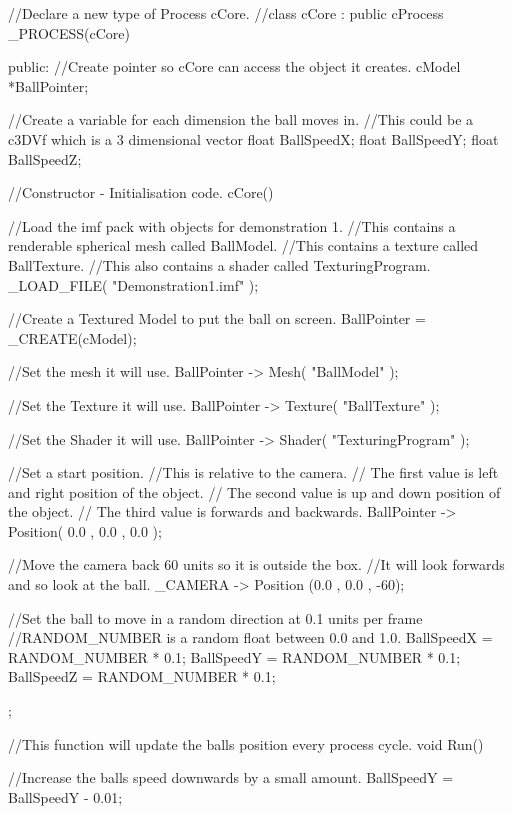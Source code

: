 \begin{DoxyCode}
 //Declare a new type of Process cCore.
 //class cCore : public cProcess
 _PROCESS(cCore)
 {
 public:
 //Create pointer so cCore can  access the object it creates.
 cModel *BallPointer;

 //Create a variable for each dimension the ball moves in.
 //This could be a c3DVf which is a 3 dimensional vector
 float BallSpeedX;
 float BallSpeedY;
 float BallSpeedZ;

  //Constructor - Initialisation code.
        cCore()
        {

        //Load the imf pack with objects for demonstration 1.
        //This contains a renderable spherical mesh called BallModel.
        //This contains a texture called BallTexture.
        //This also contains a shader called TexturingProgram.
         _LOAD_FILE( "Demonstration1.imf" );

        //Create a Textured Model to put the ball on screen.
        BallPointer =  _CREATE(cModel);

        //Set the mesh it will use.
        BallPointer -> Mesh( "BallModel" );

        //Set the Texture it will use.
        BallPointer -> Texture( "BallTexture" );

        //Set the Shader it will use.
        BallPointer -> Shader( "TexturingProgram" );

        //Set a start position.
        //This is relative to the camera.
        // The first value is left and right position of the object.
        // The second value is up and down position of the object.
        // The third value is forwards and backwards.
        BallPointer -> Position( 0.0 , 0.0 , 0.0 );

        //Move the camera back 60 units so it is outside the box.
        //It will look forwards and so look at the ball.
        _CAMERA -> Position (0.0 , 0.0 , -60);

        //Set the ball to move in a random direction at 0.1 units per frame
        //RANDOM_NUMBER is a random float between 0.0 and 1.0.
        BallSpeedX = RANDOM_NUMBER * 0.1;
        BallSpeedY = RANDOM_NUMBER * 0.1;
        BallSpeedZ = RANDOM_NUMBER * 0.1;

        };

        //This function will update the balls position every process cycle.
        void Run()
        {
                //Increase the balls speed downwards by a small amount.
                BallSpeedY = BallSpeedY - 0.01;

}}
\end{DoxyCode}
